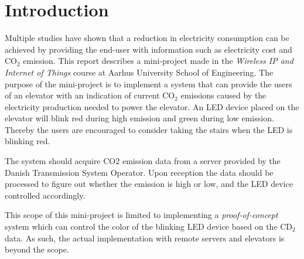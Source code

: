 \documentclass[Main]{subfiles}
\begin{document}
\section{Introduction} %
\label{sec:introduction}
	Multiple studies have shown that a reduction in electricity consumption can be achieved by providing the end-user with information such as electricity cost and CO$_2$ emission\cite{Tricascade:2009:Online}. 
	This report describes a mini-project made in the \textit{Wireless IP and Internet of Things} course at Aarhus University School of Engineering. 
	The purpose of the mini-project is to implement a system that can provide the users of an elevator with an indication of current CO$_2$ emissions caused by the electricity production needed to power the elevator. 
	An LED device placed on the elevator will blink red during high emission and green during low emission. 
	Thereby the users are encouraged to consider taking the stairs when the LED is blinking red. 

	The system should acquire CO$2$ emission data from a server provided by the Danish Transmission System Operator. 
	Upon reception the data should be processed to figure out whether the emission is high or low, and the LED device controlled accordingly.

	This scope of this mini-project is limited to implementing a \textit{proof-of-concept} system which can control the color of the blinking LED device based on the CD$_2$ data.
	As such, the actual implementation with remote servers and elevators is beyond the scope.



\end{document}
